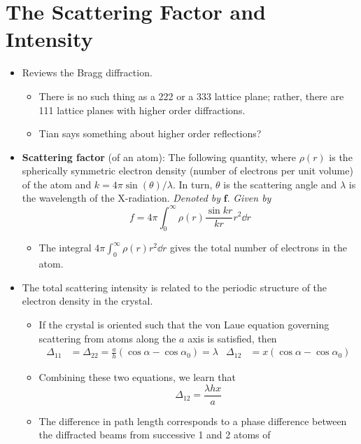\documentclass[../notes.tex]{subfiles}
\begin{document}
\section{The Scattering Factor and Intensity}
\begin{itemize}
    \item {}Reviews the Bragg diffraction.
    \begin{itemize}
        \item There is no such thing as a 222 or a 333 lattice plane; rather, there are 111 lattice planes with higher order diffractions.
        \item Tian says something about higher order reflections?
    \end{itemize}
    \item \textbf{Scattering factor} (of an atom): The following quantity, where $\rho(r)$ is the spherically symmetric electron density (number of electrons per unit volume) of the atom and $k=4\pi\sin(\theta)/\lambda$. In turn, $\theta$ is the scattering angle and $\lambda$ is the wavelength of the X-radiation. \emph{Denoted by} $\bm{f}$. \emph{Given by}
    \begin{equation*}
        f = 4\pi\int_0^\infty\rho(r)\frac{\sin kr}{kr}r^2\dd{r}
    \end{equation*}
    \begin{itemize}
        \item The integral $4\pi\int_0^\infty\rho(r)r^2\dd{r}$ gives the total number of electrons in the atom.
    \end{itemize}
    \item The total scattering intensity is related to the periodic structure of the electron density in the crystal.
    \begin{itemize}
        \item If the crystal is oriented such that the von Laue equation governing scattering from atoms along the $a$ axis is satisfied, then
        \begin{align*}
            \Delta_{11} &= \Delta_{22}
                = \frac{a}{h}(\cos\alpha-\cos\alpha_0)
                = \lambda&
            \Delta_{12} &= x(\cos\alpha-\cos\alpha_0)
        \end{align*}
        \item Combining these two equations, we learn that
        \begin{equation*}
            \Delta_{12} = \frac{\lambda hx}{a}
        \end{equation*}
        \item The difference in path length corresponds to a phase difference between the diffracted beams from successive 1 and 2 atoms of

\end{itemize}
\end{itemize}
\end{document}

